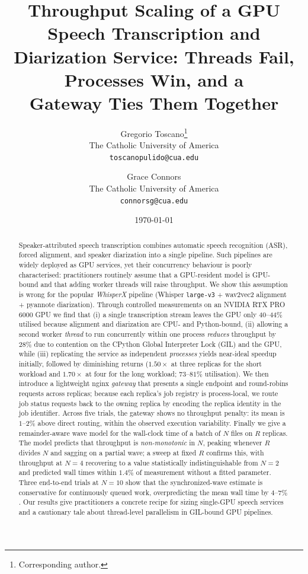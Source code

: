 \documentclass[10pt]{article}
\title{\textbf{Throughput Scaling of a GPU Speech Transcription and\\
Diarization Service: Threads Fail, Processes Win, and a\\
Gateway Ties Them Together}}
\author{%
  Gregorio Toscano\thanks{Corresponding author.}\\
  The Catholic University of America\\
  \texttt{toscanopulido@cua.edu}
  \and
  Grace Connors\\
  The Catholic University of America\\
  \texttt{connorsg@cua.edu}
}
\date{\today}
\begin{document}
\maketitle

\begin{abstract}
Speaker-attributed speech transcription combines automatic speech recognition
(ASR), forced alignment, and speaker diarization into a single pipeline. Such
pipelines are widely deployed as GPU services, yet their concurrency behaviour
is poorly characterised: practitioners routinely assume that a GPU-resident
model is GPU-bound and that adding worker threads will raise throughput. We show
this assumption is wrong for the popular \emph{WhisperX} pipeline (Whisper
\texttt{large-v3} + wav2vec2 alignment + pyannote diarization). Through
controlled measurements on an NVIDIA RTX PRO 6000 GPU we find that (i) a single
transcription stream leaves the GPU only $40$--$44\%$ utilised because
alignment and diarization are CPU- and Python-bound, (ii) allowing a second
worker \emph{thread} to run concurrently within one process \emph{reduces}
throughput by $28\%$ due
to contention on the CPython Global Interpreter Lock (GIL) and the GPU, while
(iii) replicating the service as independent \emph{processes} yields near-ideal
speedup initially, followed by diminishing returns ($1.50\times$ at three
replicas for the short workload and $1.70\times$ at four for the long workload;
$73$--$81\%$ utilisation). We then introduce a lightweight nginx
\emph{gateway} that presents a single endpoint and round-robins requests across
replicas; because each replica's job registry is process-local, we route job
status requests back to the owning replica by encoding the replica identity in
the job identifier. Across five trials, the gateway shows no throughput penalty:
its mean is $1$--$2\%$ above direct routing, within the observed execution
variability. Finally we give a remainder-aware wave model for the wall-clock
time of a batch of $N$ files on $R$ replicas. The model predicts that
throughput is \emph{non-monotonic} in $N$, peaking whenever $R$ divides $N$
and sagging on a partial wave; a sweep at fixed $R$ confirms this, with
throughput at $N{=}4$ recovering to a value statistically indistinguishable
from $N{=}2$ and predicted wall times within $1.4\%$ of measurement without a
fitted parameter. Three end-to-end trials at $N{=}10$ show that the
synchronized-wave estimate is conservative for continuously queued work,
overpredicting the mean wall time by $4$--$7\%$. Our
results give practitioners a concrete recipe for sizing single-GPU speech
services and a cautionary tale about thread-level parallelism in GIL-bound
GPU pipelines.
\end{abstract}
\end{document}
